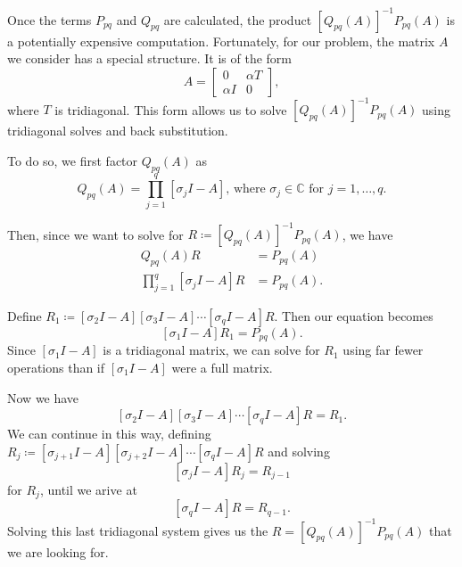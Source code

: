 \documentclass{csri19}
\begin{document}
Once the terms $P_{pq}$ and $Q_{pq}$ are calculated, the product $\left[Q_{pq}(A)\right]^{-1}P_{pq}(A)$ is a potentially expensive computation.
Fortunately, for our problem, the matrix $A$ we consider has a special structure. It is of the form \[A= \begin{bmatrix} 0 & \alpha T\\
  \alpha I & 0 \end{bmatrix},\]
where $T$ is tridiagonal. This form allows us to solve $\left[Q_{pq}(A)\right]^{-1}P_{pq}(A)$ using tridiagonal solves and back substitution.

To do so, we first factor $Q_{pq}(A)$ as
\[ Q_{pq}(A) = \prod_{j=1}^q\left[\sigma_jI-A\right]\text{, where }\sigma_j\in \mathbb{C}\text{ for }j=1,\dots,q.\]

Then, since we want to solve for $R \coloneqq \left[Q_{pq}(A)\right]^{-1}P_{pq}(A)$, we have
\begin{align*}
Q_{pq}(A) R &= P_{pq}(A)\\
\prod_{j=1}^q\left[\sigma_jI-A\right]R &= P_{pq}(A).
\end{align*}

Define $R_1 \coloneqq \left[\sigma_2I-A\right]\left[\sigma_3I-A\right]\cdots\left[\sigma_qI-A\right]R$.
Then our equation becomes
\[ \left[\sigma_1I-A\right]R_1 = P_{pq}(A).\] Since $\left[\sigma_1I-A\right]$ is a tridiagonal matrix, we can solve for $R_1$ using far fewer operations than if $\left[\sigma_1I-A\right]$ were a full matrix.

Now we have
\[\left[\sigma_2I-A\right]\left[\sigma_3I-A\right]\cdots\left[\sigma_qI-A\right]R = R_1.\] We can continue in this way, defining $R_j \coloneqq \left[\sigma_{j+1}I-A\right]\left[\sigma_{j+2}I-A\right]\cdots\left[\sigma_qI-A\right]R$ and solving
\[\left[\sigma_jI-A\right]R_j = R_{j-1}\] for $R_j$, until we arive at
\[\left[\sigma_qI-A\right]R = R_{q-1}.\] Solving this last tridiagonal system gives us the $R = \left[Q_{pq}(A)\right]^{-1}P_{pq}(A)$ that we are looking for.
\end{document}
